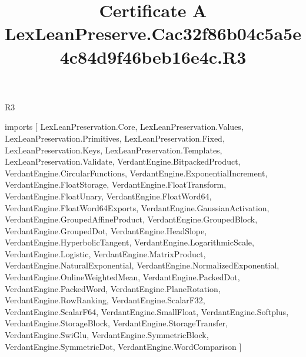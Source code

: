 \begin{lexlean}{R3}
\title{Certificate A LexLeanPreserve.Cac32f86b04c5a5e4c84d9f46beb16e4c.R3}
\begin{coremodule}
imports [
  LexLeanPreservation.Core,
  LexLeanPreservation.Values,
  LexLeanPreservation.Primitives,
  LexLeanPreservation.Fixed,
  LexLeanPreservation.Keys,
  LexLeanPreservation.Templates,
  LexLeanPreservation.Validate,
  VerdantEngine.BitpackedProduct,
  VerdantEngine.CircularFunctions,
  VerdantEngine.ExponentialIncrement,
  VerdantEngine.FloatStorage,
  VerdantEngine.FloatTransform,
  VerdantEngine.FloatUnary,
  VerdantEngine.FloatWord64,
  VerdantEngine.FloatWord64Exports,
  VerdantEngine.GaussianActivation,
  VerdantEngine.GroupedAffineProduct,
  VerdantEngine.GroupedBlock,
  VerdantEngine.GroupedDot,
  VerdantEngine.HeadSlope,
  VerdantEngine.HyperbolicTangent,
  VerdantEngine.LogarithmicScale,
  VerdantEngine.Logistic,
  VerdantEngine.MatrixProduct,
  VerdantEngine.NaturalExponential,
  VerdantEngine.NormalizedExponential,
  VerdantEngine.OnlineWeightedMean,
  VerdantEngine.PackedDot,
  VerdantEngine.PackedWord,
  VerdantEngine.PlaneRotation,
  VerdantEngine.RowRanking,
  VerdantEngine.ScalarF32,
  VerdantEngine.ScalarF64,
  VerdantEngine.SmallFloat,
  VerdantEngine.Softplus,
  VerdantEngine.StorageBlock,
  VerdantEngine.StorageTransfer,
  VerdantEngine.SwiGlu,
  VerdantEngine.SymmetricBlock,
  VerdantEngine.SymmetricDot,
  VerdantEngine.WordComparison
]


\end{coremodule}
\end{lexlean}
